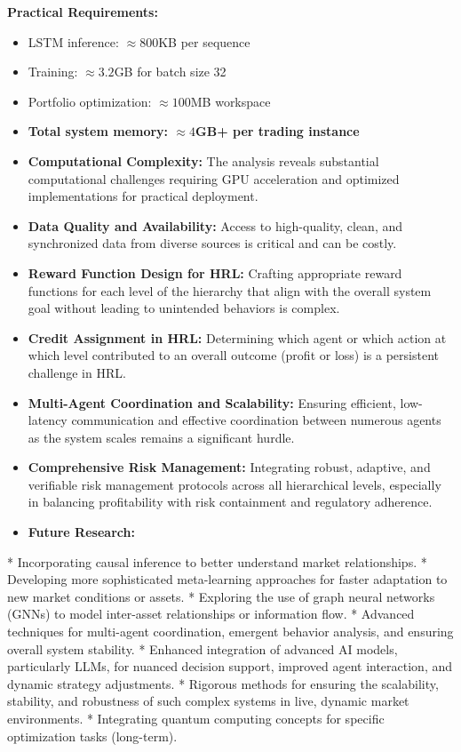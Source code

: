 \documentclass[11pt]{article}
\begin{document}
\textbf{Practical Requirements:}
\begin{itemize}
\item LSTM inference: $\approx 800$KB per sequence
\item Training: $\approx 3.2$GB for batch size 32
\item Portfolio optimization: $\approx 100$MB workspace
\item \textbf{Total system memory: $\approx 4$GB+ per trading instance}

\item   \textbf{Computational Complexity:} The analysis reveals substantial computational challenges requiring GPU acceleration and optimized implementations for practical deployment.
\item   \textbf{Data Quality and Availability:} Access to high-quality, clean, and synchronized data from diverse sources is critical and can be costly.
\item   \textbf{Reward Function Design for HRL:} Crafting appropriate reward functions for each level of the hierarchy that align with the overall system goal without leading to unintended behaviors is complex.
\item   \textbf{Credit Assignment in HRL:} Determining which agent or which action at which level contributed to an overall outcome (profit or loss) is a persistent challenge in HRL.
\item   \textbf{Multi-Agent Coordination and Scalability:} Ensuring efficient, low-latency communication and effective coordination between numerous agents as the system scales remains a significant hurdle.
\item   \textbf{Comprehensive Risk Management:} Integrating robust, adaptive, and verifiable risk management protocols across all hierarchical levels, especially in balancing profitability with risk containment and regulatory adherence.
\item   \textbf{Future Research:}
\end{itemize}
    *   Incorporating causal inference to better understand market relationships.
    *   Developing more sophisticated meta-learning approaches for faster adaptation to new market conditions or assets.
    *   Exploring the use of graph neural networks (GNNs) to model inter-asset relationships or information flow.
    *   Advanced techniques for multi-agent coordination, emergent behavior analysis, and ensuring overall system stability.
    *   Enhanced integration of advanced AI models, particularly LLMs, for nuanced decision support, improved agent interaction, and dynamic strategy adjustments.
    *   Rigorous methods for ensuring the scalability, stability, and robustness of such complex systems in live, dynamic market environments.
    *   Integrating quantum computing concepts for specific optimization tasks (long-term).
\end{document}
